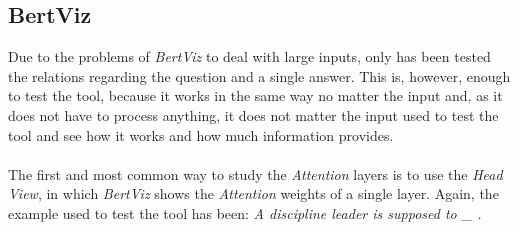 \subsection{BertViz}
\label{sec:BertVizResults}
\noindent Due to the problems of \emph{BertViz} to deal with large inputs, only has been tested the relations regarding the question and a single answer. This is, however, enough to test the tool, because it works in the same way no matter the input and, as it does not have to process anything, it does not matter the input used to test the tool and see how it works and how much information provides.
\paragraph{}
The first and most common way to study the \emph{Attention} layers is to use the \emph{Head View}, in which \emph{BertViz} shows the \emph{Attention} weights of a single layer. Again, the example used to test the tool has been: \textit{A discipline leader is supposed to  \_  .} 
